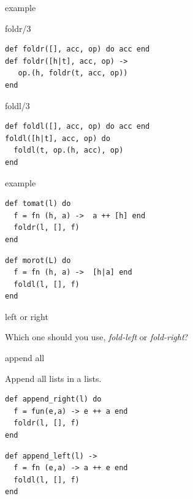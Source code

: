 \begin{frame}[fragile]{example}
     \begin{block}{foldr/3}
       \begin{verbatim}
def foldr([], acc, op) do acc end
def foldr([h|t], acc, op) ->
   op.(h, foldr(t, acc, op))
end
       \end{verbatim}
     \end{block}
\pause
     \begin{block}{foldl/3}
       \begin{verbatim}
def foldl([], acc, op) do acc end
foldl([h|t], acc, op) do
  foldl(t, op.(h, acc), op)
end
       \end{verbatim}
     \end{block}
\end{frame}


\begin{frame}[fragile]{example}

\pause\vspace{10pt}
\begin{verbatim}
def tomat(l) do
  f = fn (h, a) ->  a ++ [h] end
  foldr(l, [], f)
end
\end{verbatim}
\pause 
\begin{verbatim}
def morot(L) do
  f = fn (h, a) ->  [h|a] end
  foldl(l, [], f)
end
\end{verbatim}
\end{frame}

\begin{frame}{left or right}

Which one should you use, {\em fold-left} or {\em fold-right}?

\end{frame}

\begin{frame}[fragile]{append all}

\pause Append all lists in a lists.

\vspace{20pt}

\begin{verbatim}
def append_right(l) do
  f = fun(e,a) -> e ++ a end
  foldr(l, [], f)
end
\end{verbatim}

\begin{verbatim}
def append_left(l) ->
  f = fn (e,a) -> a ++ e end
  foldl(l, [], f)
end
\end{verbatim}

\end{frame}



